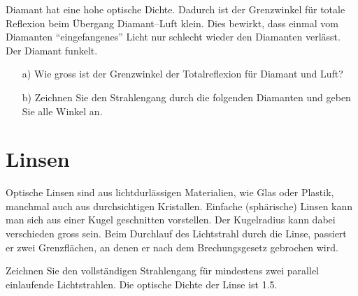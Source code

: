 \documentclass[paper=a4,twoside=true,,DIV13,BCOR1cm]{scrartcl}
\begin{document}
\begin{aufgabe}
Diamant hat eine hohe optische Dichte. Dadurch ist der Grenzwinkel für totale Reflexion
beim Übergang Diamant--Luft klein.
Dies bewirkt, dass einmal vom Diamanten ``eingefangenes'' Licht nur schlecht wieder den Diamanten verlässt.
Der Diamant funkelt.
\begin{itemize}
	\item [a)] Wie gross ist der Grenzwinkel der Totalreflexion für Diamant und Luft?
	\item [b)] Zeichnen Sie den Strahlengang durch die folgenden Diamanten und geben Sie alle Winkel an.
		\begin{center}
			

\vspace*{1cm}

		\end{center}


\end{itemize}
\end{aufgabe}







\section{Linsen}

Optische Linsen sind aus lichtdurlässigen Materialien, wie Glas oder Plastik, manchmal auch aus durchsichtigen Kristallen.
Einfache (sphärische) Linsen kann man sich aus einer Kugel geschnitten vorstellen. Der Kugelradius kann dabei verschieden gross sein.
Beim Durchlauf des Lichtstrahl durch die Linse, passiert er zwei Grenzflächen, an denen er nach dem Brechungsgesetz gebrochen wird.

\begin{aufgabe}
Zeichnen Sie den vollständigen Strahlengang für mindestens zwei parallel einlaufende Lichtstrahlen.
Die optische Dichte der Linse ist \num{1.5}.
\end{aufgabe}
\end{document}
